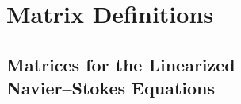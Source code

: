 %
%
%
%
%
%
%
\newcommand{\dlm}{\lambda_{,T}}
\newcommand{\dmu}{\mu_{,T}}
\newcommand{\dcon}{\kappa_{,T}}
%
\newcommand{\fact}{{\frac{1}{\rho\Re}}}
\newcommand{\divu}{{u_{i,i}}}
\newcommand{\gammam}{(\gamma-1)}
\newcommand{\ff}{{\frac{\gamma(\gamma-1)\M^2}{\rho\Re}}}
%
\newcommand{\vvss}{v_{s,s}}
\newcommand{\vsss}{v_{s,ss}}
\newcommand{\vssn}{v_{s,sn}}
\newcommand{\vssz}{v_{s,sz}}
\newcommand{\vsn}{v_{s,n}}
\newcommand{\vsnn}{v_{s,nn}}
\newcommand{\vsz}{v_{s,z}}
\newcommand{\vszz}{v_{s,zz}}
%
\newcommand{\vns}{v_{n,s}}
\newcommand{\vnss}{v_{n,ss}}
\newcommand{\vnsn}{v_{n,sn}}
\newcommand{\vnsz}{v_{n,sz}}
\newcommand{\vnn}{v_{n,n}}
\newcommand{\vnnn}{v_{n,nn}}
\newcommand{\vnnz}{v_{n,nz}}
\newcommand{\vnz}{v_{n,z}}
\newcommand{\vnzz}{v_{n,zz}}
%
\newcommand{\ws}{w_{,s}}
\newcommand{\wss}{w_{,ss}}
\newcommand{\wsn}{w_{,sn}}
\newcommand{\wsz}{w_{,sz}}
\newcommand{\wn}{w_{,n}}
\newcommand{\wnn}{w_{,nn}}
\newcommand{\wnz}{w_{,nz}}
\newcommand{\wz}{w_{,z}}
\newcommand{\wzz}{w_{,zz}}
%
\newcommand{\Ts}{T_{,s}}
\newcommand{\Tn}{T_{,n}}
\newcommand{\Tz}{T_{,z}}
\newcommand{\Tss}{T_{,ss}}
\newcommand{\Tnn}{T_{,nn}}
\newcommand{\Tzz}{T_{,zz}}
%
\newcommand{\hn}{h_{,n}}
\newcommand{\hs}{h_{,s}}
\newcommand{\hhss}{h_{,ss}}
\newcommand{\hsn}{h_{,sn}}
\newcommand{\hnn}{h_{,nn}}
%
\newcommand{\ffh}{{\frac{\gamma(\gamma-1)\M^2}{\rho h \Re}}}
\newcommand{\facth}{{\frac{1}{\rho h \Re}}}
\newcommand{\bc}{{\bf c}}
%
%
\chapter{Matrix Definitions}

\section[Matrices for the Linearized Navier--Stokes Equations]{Matrices 
for the Linearized \protect\\ Navier--Stokes Equations \label{s:linmat}}

